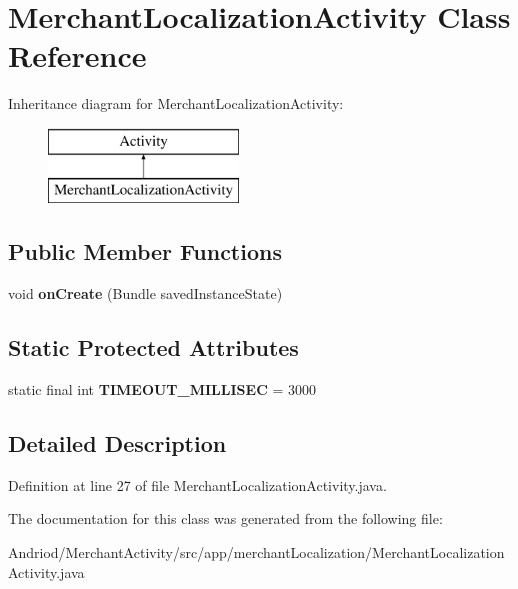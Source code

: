 \hypertarget{classapp_1_1merchant_localization_1_1_merchant_localization_activity}{\section{Merchant\-Localization\-Activity Class Reference}
\label{classapp_1_1merchant_localization_1_1_merchant_localization_activity}
}
Inheritance diagram for Merchant\-Localization\-Activity\-:\begin{figure}[H]
\begin{center}
\leavevmode
\includegraphics[height=2.000000cm]{classapp_1_1merchant_localization_1_1_merchant_localization_activity}
\end{center}
\end{figure}
\subsection*{Public Member Functions}
\begin{DoxyCompactItemize}
\item 
\hypertarget{classapp_1_1merchant_localization_1_1_merchant_localization_activity_a85e87cb5ced88dff7c8173ecc4f636d1}{void {\bfseries on\-Create} (Bundle saved\-Instance\-State)}\label{classapp_1_1merchant_localization_1_1_merchant_localization_activity_a85e87cb5ced88dff7c8173ecc4f636d1}

\end{DoxyCompactItemize}
\subsection*{Static Protected Attributes}
\begin{DoxyCompactItemize}
\item 
\hypertarget{classapp_1_1merchant_localization_1_1_merchant_localization_activity_af5858805af6e7dae14f55e3f4d0e0f9e}{static final int {\bfseries T\-I\-M\-E\-O\-U\-T\-\_\-\-M\-I\-L\-L\-I\-S\-E\-C} = 3000}\label{classapp_1_1merchant_localization_1_1_merchant_localization_activity_af5858805af6e7dae14f55e3f4d0e0f9e}

\end{DoxyCompactItemize}


\subsection{Detailed Description}


Definition at line 27 of file Merchant\-Localization\-Activity.\-java.



The documentation for this class was generated from the following file\-:\begin{DoxyCompactItemize}
\item 
Andriod/\-Merchant\-Activity/src/app/merchant\-Localization/Merchant\-Localization\-Activity.\-java\end{DoxyCompactItemize}
